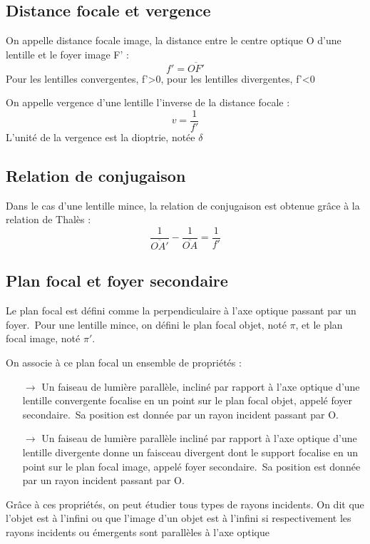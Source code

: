 \subsection{Distance focale et vergence}
\begin{de}
On appelle distance focale image, la distance entre le centre optique O d'une lentille et le foyer image F' :
$$f' = \overline{OF'}$$
Pour les lentilles convergentes, f'>0, pour les lentilles divergentes, f'<0
\end{de}
\begin{de}
On appelle vergence d'une lentille l'inverse de la distance focale :
$$v = \dfrac{1}{f'}$$
L'unité de la vergence est la dioptrie, notée $\delta$
\end{de}
\subsection{Relation de conjugaison}
Dans le cas d'une lentille mince, la relation de conjugaison est obtenue grâce à la relation de Thalès : 
$$\dfrac{1}{\overline{OA'}} - \dfrac{1}{\overline{OA}} = \dfrac{1}{f'}$$
\subsection{Plan focal et foyer secondaire}
\begin{de}
Le plan focal est défini comme la perpendiculaire à l'axe optique passant par un foyer.\
Pour une lentille mince, on défini le plan focal objet, noté $\pi$, et le plan focal image, noté $\pi'$. 
\end{de}
On associe à ce plan focal un ensemble de propriétés : 
\begin{itemize}
 \item[$\rightarrow$] Un faiseau de lumière parallèle, incliné par rapport à l'axe optique d'une lentille convergente focalise en un point sur le plan focal objet, appelé foyer secondaire.\
Sa position est donnée par un rayon incident passant par O.
\item[$\rightarrow$] Un faiseau de lumière parallèle incliné par rapport à l'axe optique d'une lentille divergente donne un faisceau divergent dont le support focalise en un point sur le plan focal image, appelé foyer secondaire.\
Sa position est donnée par un rayon incident passant par O.
\end{itemize}
Grâce à ces propriétés, on peut étudier tous types de rayons incidents. On dit que l'objet est à l'infini ou que l'image d'un objet est à l'infini si respectivement les rayons incidents ou émergents sont parallèles à l'axe optique


